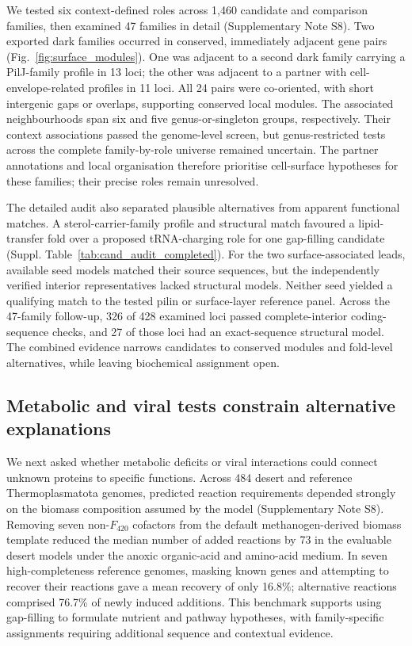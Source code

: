 \documentclass[11pt]{article}
\begin{document}
We tested six context-defined roles across 1,460 candidate and comparison families, then examined 47 families in detail (Supplementary Note S8). Two exported dark families occurred in conserved, immediately adjacent gene pairs (Fig.~\ref{fig:surface_modules}). One was adjacent to a second dark family carrying a PilJ-family profile in 13 loci; the other was adjacent to a partner with cell-envelope-related profiles in 11 loci. All 24 pairs were co-oriented, with short intergenic gaps or overlaps, supporting conserved local modules. The associated neighbourhoods span six and five genus-or-singleton groups, respectively. Their context associations passed the genome-level screen, but genus-restricted tests across the complete family-by-role universe remained uncertain. The partner annotations and local organisation therefore prioritise cell-surface hypotheses for these families; their precise roles remain unresolved.

The detailed audit also separated plausible alternatives from apparent functional matches. A sterol-carrier-family profile and structural match favoured a lipid-transfer fold over a proposed tRNA-charging role for one gap-filling candidate (Suppl. Table~\ref{tab:cand_audit_completed}). For the two surface-associated leads, available seed models matched their source sequences, but the independently verified interior representatives lacked structural models. Neither seed yielded a qualifying match to the tested pilin or surface-layer reference panel. Across the 47-family follow-up, 326 of 428 examined loci passed complete-interior coding-sequence checks, and 27 of those loci had an exact-sequence structural model. The combined evidence narrows candidates to conserved modules and fold-level alternatives, while leaving biochemical assignment open.

\subsection*{Metabolic and viral tests constrain alternative explanations}

We next asked whether metabolic deficits or viral interactions could connect unknown proteins to specific functions. Across 484 desert and reference Thermoplasmatota genomes, predicted reaction requirements depended strongly on the biomass composition assumed by the model (Supplementary Note S8). Removing seven non-$F_{420}$ cofactors from the default methanogen-derived biomass template reduced the median number of added reactions by 73 in the evaluable desert models under the anoxic organic-acid and amino-acid medium. In seven high-completeness reference genomes, masking known genes and attempting to recover their reactions gave a mean recovery of only 16.8\%; alternative reactions comprised 76.7\% of newly induced additions. This benchmark supports using gap-filling to formulate nutrient and pathway hypotheses, with family-specific assignments requiring additional sequence and contextual evidence.
\end{document}
